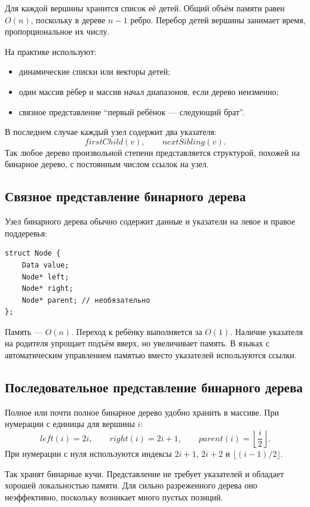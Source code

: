 Для каждой вершины хранится список её детей. Общий объём памяти равен $O(n)$,
поскольку в дереве $n-1$ ребро. Перебор детей вершины занимает время,
пропорциональное их числу.

На практике используют:
\begin{itemize}
    \item динамические списки или векторы детей;
    \item один массив рёбер и массив начал диапазонов, если дерево неизменно;
    \item связное представление ``первый ребёнок --- следующий брат''.
\end{itemize}

В последнем случае каждый узел содержит два указателя:
\[
    firstChild(v),\qquad nextSibling(v).
\]
Так любое дерево произвольной степени представляется структурой, похожей на
бинарное дерево, с постоянным числом ссылок на узел.

\subsection{Связное представление бинарного дерева}

Узел бинарного дерева обычно содержит данные и указатели на левое и правое
поддеревья:
\begin{verbatim}
struct Node {
    Data value;
    Node* left;
    Node* right;
    Node* parent; // необязательно
};
\end{verbatim}

Память --- $O(n)$. Переход к ребёнку выполняется за $O(1)$. Наличие указателя на
родителя упрощает подъём вверх, но увеличивает память. В языках с автоматическим
управлением памятью вместо указателей используются ссылки.

\subsection{Последовательное представление бинарного дерева}

Полное или почти полное бинарное дерево удобно хранить в массиве. При нумерации
с единицы для вершины $i$:
\[
    left(i)=2i,
    \qquad
    right(i)=2i+1,
    \qquad
    parent(i)=\left\lfloor\frac{i}{2}\right\rfloor.
\]
При нумерации с нуля используются индексы $2i+1$, $2i+2$ и
$\lfloor(i-1)/2\rfloor$.

Так хранят бинарные кучи. Представление не требует указателей и обладает хорошей
локальностью памяти. Для сильно разреженного дерева оно неэффективно, поскольку
возникает много пустых позиций.

